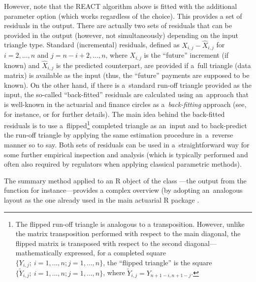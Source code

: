 However, note that the REACT algorithm above is fitted with the additional parameter option  (which works regardless of the  choice). This provides a set of residuals in the output. There are actually two  sets of residuals that can be provided in the output (however, not simultaneously) depending on the input triangle type. Standard (incremental) residuals, defined as $X_{i,j} - \widehat{X}_{i,j}$ for $i = 2, \dots, n$ and $j = n - i + 2, \dots, n$, where $X_{i, j}$ is the ``future'' increment (if known) and $\widehat{X}_{i,j}$ is the predicted counterpart, are provided if a~full triangle (data matrix) is available as the input (thus, the ``future'' payments are supposed to be known). On the other hand, if there is a~standard run-off triangle provided as the input, the so-called ``back-fitted'' residuals are calculated using an~approach that is well-known in the actuarial and finance circles as a~\emph{back-fitting} approach (see, for instance, \cite{popescu_suciu} or \cite{MMP2022} for further details). The main idea behind the back-fitted residuals is to use a~flipped\footnote{The flipped run-off triangle is analogous to a transposition. However, unlike the matrix transposition performed with respect to the main diagonal, the flipped matrix is transposed with respect to the second diagonal---mathematically expressed, for a completed square $\{Y_{i,j};~i = 1, \dots, n; j = 1, \dots, n\}$, the ``flipped triangle'' is the square $\{\widetilde{Y}_{i,j};~i= 1, \dots, n; j = 1, \dots, n\}$, where $\widetilde{Y}_{i,j} = Y_{n + 1 - i, n + 1 - j}$.} completed triangle as an~input and to back-predict the run-off triangle by applying the same estimation procedure in~a~reverse manner so to say. Both sets of residuals can be used in a~straightforward way for some further empirical inspection and analysis (which is typically performed and often also required by regulators when applying  classical parametric methods). 

The summary method applied to an R object of the class ---the output from the  function for instance---provides a complex overview (by adopting an~analogous layout as the one already used in the main actuarial R package .  

